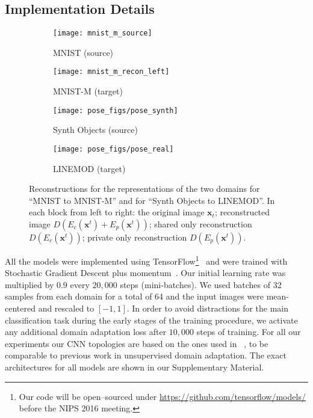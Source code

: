 \documentclass{article}
\newcommand{\bs}[1]{\boldsymbol{\mathbf{#1}}}
\begin{document}
\subsection{Implementation Details}
\begin{figure}[t]
    \centering
\begin{subfigure}[b]{.23\linewidth}
        \centering
        \texttt{[image: mnist\_m\_source]}
        \caption{MNIST (source)}
        \label{fig:mnist_to_mnist-m_source}
    \end{subfigure}          \hfill
    \begin{subfigure}[b]{.23\linewidth}
        \centering
    \texttt{[image: mnist\_m\_recon\_left]}
        \caption{MNIST-M (target)}
        \label{fig:mnist_to_mnist-m_target}
    \end{subfigure}          \hfill
    \begin{subfigure}[b]{.23\linewidth}
        \centering
        \texttt{[image: pose\_figs/pose\_synth]}
        \caption{Synth Objects (source)}
        \label{fig:mnist_to_mnist-m_target}
    \end{subfigure}          \hfill
    \begin{subfigure}[b]{.23\linewidth}
        \centering
        \texttt{[image: pose\_figs/pose\_real]}
        \caption{LINEMOD (target)}
        \label{fig:mnist_to_mnist-m_target}
    \end{subfigure}          \hfill    
    \caption{Reconstructions for the representations of the two domains for ``MNIST to MNIST-M'' and for ``Synth Objects to LINEMOD''. In each block from left to right: the original image $\bs x_t$; reconstructed image $D({E_c(\bs x^t) + E_p(\bs x^t)}) $; shared only reconstruction  $D(E_c(\bs x^t)) $;  private only reconstruction  $D(E_p(\bs x^t))$.}
    \label{fig:mnist_m_visualizations}
\end{figure}
All the models were implemented using TensorFlow\footnote{Our code will be open--sourced under \url{https://github.com/tensorflow/models/} before the NIPS 2016 meeting.}~\cite{abadi2016tensorflow} and were trained with Stochastic Gradient Descent plus momentum~\cite{sutskever2013momentum}. Our initial learning rate was multiplied by $0.9$ every $20,000$ steps (mini-batches). We used batches of 32 samples from each domain for a total of 64 and
the input images were mean-centered and rescaled to $[-1, 1]$.
In order to avoid distractions for the main classification task during the early stages of the training procedure, we activate any additional domain adaptation loss after $10,000$ steps of training. 
For all our experiments our CNN topologies are based on the ones used in ~\cite{ganin2016domain}, to be comparable to previous work in unsupervised domain adaptation. The exact architectures for all models are shown in our Supplementary Material. 
\end{document}
